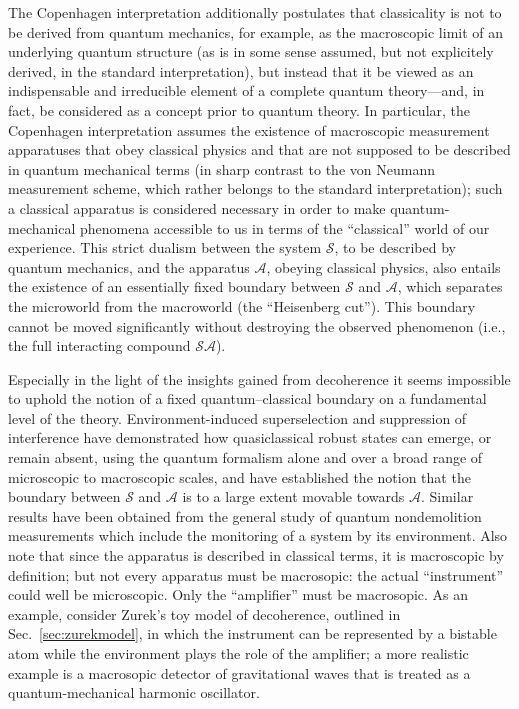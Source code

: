 \documentclass[rmp,aps,amsmath,amsfonts,noshowkeys,noshowpacs,12pt]{revtex4}
\begin{document}
The Copenhagen interpretation additionally postulates that
classicality is not to be derived from quantum mechanics, for example,
as the macroscopic limit of an underlying quantum structure (as is in
some sense assumed, but not explicitely derived, in the standard
interpretation), but instead that it be viewed as an indispensable and
irreducible element of a complete quantum theory---and, in fact, be
considered as a concept prior to quantum theory.  In particular, the
Copenhagen interpretation assumes the existence of macroscopic
measurement apparatuses that obey classical physics and that are not
supposed to be described in quantum mechanical terms (in sharp
contrast to the von Neumann measurement scheme, which rather belongs
to the standard interpretation); such a classical apparatus is
considered necessary in order to make quantum-mechanical phenomena
accessible to us in terms of the ``classical'' world of our
experience. This strict dualism between the system $\mathcal{S}$, to
be described by quantum mechanics, and the apparatus $\mathcal{A}$,
obeying classical physics, also entails the existence of an
essentially fixed boundary between $\mathcal{S}$ and $\mathcal{A}$,
which separates the microworld from the macroworld (the ``Heisenberg
cut''). This boundary cannot be moved significantly without destroying
the observed phenomenon (i.e., the full interacting compound
$\mathcal{SA}$).

Especially in the light of the insights gained from decoherence it
seems impossible to uphold the notion of a fixed quantum--classical
boundary on a fundamental level of the theory.  Environment-induced
superselection and suppression of interference have demonstrated how
quasiclassical robust states can emerge, or remain absent, using the
quantum formalism alone and over a broad range of microscopic to
macroscopic scales, and have established the notion that the boundary
between $\mathcal{S}$ and $\mathcal{A}$ is to a large extent movable
towards $\mathcal{A}$. Similar results have been obtained from the
general study of quantum nondemolition measurements \citep[see, for
example, Chap.~19 of][]{Auletta:2000:rv} which include the monitoring
of a system by its environment. Also note that since the apparatus is
described in classical terms, it is macroscopic by definition; but not
every apparatus must be macrosopic: the actual ``instrument'' could
well be microscopic. Only the ``amplifier'' must be macrosopic. As an
example, consider Zurek's \citeyearpar{Zurek:1981:dd} toy model of
decoherence, outlined in Sec.~\ref{sec:zurekmodel}, in which the
instrument can be represented by a bistable atom while the environment
plays the role of the amplifier; a more realistic example is a
macrosopic detector of gravitational waves that is treated as a
quantum-mechanical harmonic oscillator.
\end{document}
